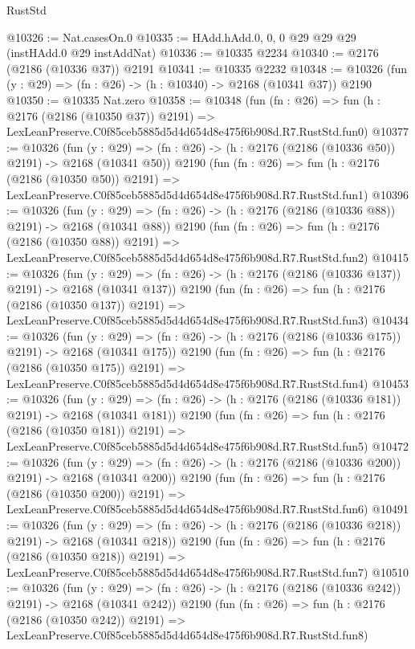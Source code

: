 \begin{lexlean}{RustStd}
\begin{coremodule}
@10326 := Nat.casesOn.{0}
@10335 := HAdd.hAdd.{0, 0, 0} @29 @29 @29 (instHAdd.{0} @29 instAddNat)
@10336 := @10335 @2234
@10340 := @2176 (@2186 (@10336 @37)) @2191
@10341 := @10335 @2232
@10348 := @10326 (fun (y : @29) => (fn : @26) -> (h : @10340) -> @2168 (@10341 @37)) @2190
@10350 := @10335 Nat.zero
@10358 := @10348
    (fun (fn : @26) =>
    fun (h : @2176 (@2186 (@10350 @37)) @2191) =>
    LexLeanPreserve.C0f85ceb5885d5d4d654d8e475f6b908d.R7.RustStd.fun0)
@10377 := @10326
    (fun (y : @29) => (fn : @26) -> (h : @2176 (@2186 (@10336 @50)) @2191) -> @2168 (@10341 @50))
    @2190
    (fun (fn : @26) =>
    fun (h : @2176 (@2186 (@10350 @50)) @2191) =>
    LexLeanPreserve.C0f85ceb5885d5d4d654d8e475f6b908d.R7.RustStd.fun1)
@10396 := @10326
    (fun (y : @29) => (fn : @26) -> (h : @2176 (@2186 (@10336 @88)) @2191) -> @2168 (@10341 @88))
    @2190
    (fun (fn : @26) =>
    fun (h : @2176 (@2186 (@10350 @88)) @2191) =>
    LexLeanPreserve.C0f85ceb5885d5d4d654d8e475f6b908d.R7.RustStd.fun2)
@10415 := @10326
    (fun (y : @29) => (fn : @26) -> (h : @2176 (@2186 (@10336 @137)) @2191) -> @2168 (@10341 @137))
    @2190
    (fun (fn : @26) =>
    fun (h : @2176 (@2186 (@10350 @137)) @2191) =>
    LexLeanPreserve.C0f85ceb5885d5d4d654d8e475f6b908d.R7.RustStd.fun3)
@10434 := @10326
    (fun (y : @29) => (fn : @26) -> (h : @2176 (@2186 (@10336 @175)) @2191) -> @2168 (@10341 @175))
    @2190
    (fun (fn : @26) =>
    fun (h : @2176 (@2186 (@10350 @175)) @2191) =>
    LexLeanPreserve.C0f85ceb5885d5d4d654d8e475f6b908d.R7.RustStd.fun4)
@10453 := @10326
    (fun (y : @29) => (fn : @26) -> (h : @2176 (@2186 (@10336 @181)) @2191) -> @2168 (@10341 @181))
    @2190
    (fun (fn : @26) =>
    fun (h : @2176 (@2186 (@10350 @181)) @2191) =>
    LexLeanPreserve.C0f85ceb5885d5d4d654d8e475f6b908d.R7.RustStd.fun5)
@10472 := @10326
    (fun (y : @29) => (fn : @26) -> (h : @2176 (@2186 (@10336 @200)) @2191) -> @2168 (@10341 @200))
    @2190
    (fun (fn : @26) =>
    fun (h : @2176 (@2186 (@10350 @200)) @2191) =>
    LexLeanPreserve.C0f85ceb5885d5d4d654d8e475f6b908d.R7.RustStd.fun6)
@10491 := @10326
    (fun (y : @29) => (fn : @26) -> (h : @2176 (@2186 (@10336 @218)) @2191) -> @2168 (@10341 @218))
    @2190
    (fun (fn : @26) =>
    fun (h : @2176 (@2186 (@10350 @218)) @2191) =>
    LexLeanPreserve.C0f85ceb5885d5d4d654d8e475f6b908d.R7.RustStd.fun7)
@10510 := @10326
    (fun (y : @29) => (fn : @26) -> (h : @2176 (@2186 (@10336 @242)) @2191) -> @2168 (@10341 @242))
    @2190
    (fun (fn : @26) =>
    fun (h : @2176 (@2186 (@10350 @242)) @2191) =>
    LexLeanPreserve.C0f85ceb5885d5d4d654d8e475f6b908d.R7.RustStd.fun8)

\end{coremodule}
\end{lexlean}
